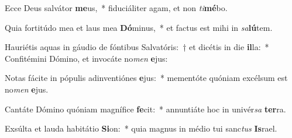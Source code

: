 \item Ecce Deus salvátor \textbf{me}us,~* fiduciáliter agam, et non \textit{ti}\textbf{mé}bo.
\item Quia fortitúdo mea et laus mea \textbf{Dó}minus,~* et factus est mihi in \textit{sa}\textbf{lú}tem.
\item Hauriétis aquas in gáudio de fóntibus Salvatóris:~† et dicétis in die \textbf{il}la:~* Confitémini Dómino, et invocáte no\textit{men} \textbf{e}jus:
\item Notas fácite in pópulis adinventiónes \textbf{e}jus:~* mementóte quóniam excélsum est no\textit{men} \textbf{e}jus.
\item Cantáte Dómino quóniam magnífice \textbf{fe}cit:~* annuntiáte hoc in univér\textit{sa} \textbf{ter}ra.
\item Exsúlta et lauda habitátio \textbf{Si}on:~* quia magnus in médio tui sanc\textit{tus} \textbf{Is}rael.
